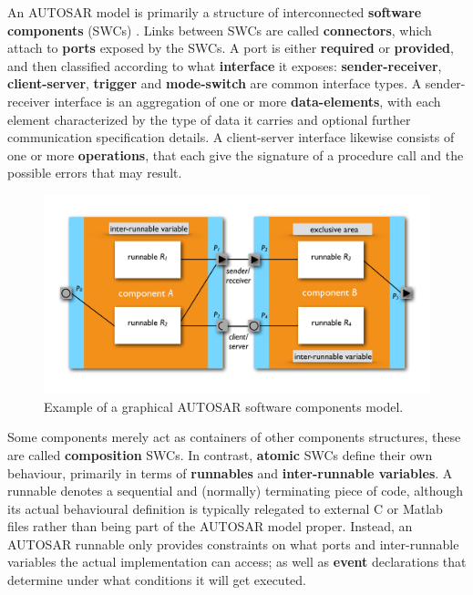 \documentclass[10pt,conference]{IEEEtran}
\begin{document}
An AUTOSAR model is primarily a structure of interconnected \textbf{software components} (SWCs) \cite{AR:SWC}. Links between SWCs are called \textbf{connectors}, which attach to \textbf{ports} exposed by the SWCs. A port is either \textbf{required} or \textbf{provided}, and then classified according to what \textbf{interface} it exposes: \textbf{sender-receiver}, \textbf{client-server}, \textbf{trigger} and \textbf{mode-switch} are common interface types. A sender-receiver interface is an aggregation of one or more \textbf{data-elements}, with each element characterized by the type of data it carries and optional further communication specification details. A client-server interface likewise consists of one or more \textbf{operations}, that each give the signature of a procedure call and the possible errors that may result.

\begin{figure}
\includegraphics[page=1,width=\textwidth]{Fig}
\caption{\label{fig:model}{Example of a graphical AUTOSAR software components model.}}
\end{figure}


Some components merely act as containers of other components structures, these are called \textbf{composition} SWCs. In contrast, \textbf{atomic} SWCs define their own behaviour, primarily in terms of \textbf{runnables} and \textbf{inter-runnable variables}. A runnable denotes a sequential and (normally) terminating piece of code, although its actual behavioural definition is typically relegated to external C or Matlab files rather than being part of the AUTOSAR model proper. Instead, an AUTOSAR runnable only provides constraints on what ports and inter-runnable variables the actual implementation can access; as well as \textbf{event} declarations that determine under what conditions it will get executed.
\end{document}
